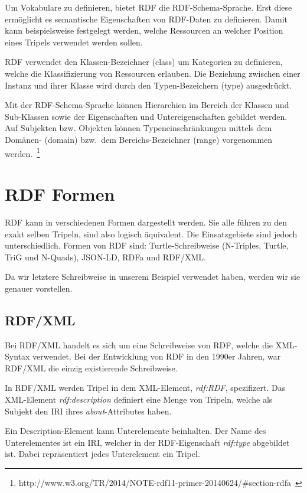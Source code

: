 Um Vokabulare zu definieren, bietet RDF die RDF-Schema-Sprache. Erst diese ermöglicht es semantische Eigenschaften von RDF-Daten zu definieren. Damit kann beispielsweise festgelegt werden, welche Ressourcen an welcher Position eines Tripels verwendet werden sollen.

RDF verwendet den Klassen-Bezeichner (class) um Kategorien zu definieren, welche die Klassifizierung von Ressourcen erlauben. Die Beziehung zwischen einer Instanz und ihrer Klasse wird durch den Typen-Bezeichern (type) ausgedrückt. 

Mit der RDF-Schema-Sprache können Hierarchien im Bereich der Klassen und Sub-Klassen sowie der Eigenschaften und Untereigenschaften gebildet werden. Auf Subjekten bzw. Objekten können Typeneinschränkungen mittels dem Domänen- (domain) bzw.\ dem Bereichs-Bezeichner (range) vorgenommen werden.~\footnote{http://www.w3.org/TR/2014/NOTE-rdf11-primer-20140624/\#section-rdfa~\cite{w3rdf}}

\section{RDF Formen}
\label{sec:rdf_rdf_formen}
RDF kann in verschiedenen Formen dargestellt werden. Sie alle führen zu den exakt selben Tripeln, sind also logisch äquivalent. Die Einsatzgebiete sind jedoch unterschiedlich.
Formen von RDF sind: Turtle-Schreibweise (N-Triples, Turtle, TriG und N-Quads), JSON-LD, RDFa und RDF/XML.\@

Da wir letztere Schreibweise in unserem Beispiel verwendet haben, werden wir sie genauer vorstellen.

\subsection{RDF/XML}
\label{sec:rdf_rdf_formen_xmlRdf}
Bei RDF/XML handelt es sich um eine Schreibweise von RDF, welche die XML-Syntax verwendet. Bei der Entwicklung von RDF in den 1990er Jahren, war RDF/XML die einzig existierende Schreibweise.

In RDF/XML werden Tripel in dem XML-Element, \textit{rdf:RDF}, spezifizert. Das XML-Element \textit{rdf:description} definiert eine Menge von Tripeln, welche als Subjekt den IRI ihres \textit{about}-Attributes haben.

Ein Description-Element kann Unterelemente beinhalten. Der Name des Unterelementes ist ein IRI, welcher in der RDF-Eigenschaft \textit{rdf:type} abgebildet ist. Dabei repräsentiert jedes Unterelement ein Tripel.

